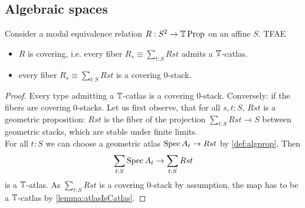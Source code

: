 \subsection{Algebraic spaces}
\begin{lemma}{\label{def:coveringEqRel}}
		Consider a modal equivalence relation $R : S^2 \to \mathbb{T} \operatorname{Prop}$ on an affine $S$. TFAE
		\begin{itemize}
			\item $R$ is covering, i.e. every fiber $R_s \equiv \sum_{t: S} R s t$ admits a $\mathbb{T}$-catlas.
			\item  every fiber $R_s \equiv \sum_{t: S} R s t$ is a covering 0-stack.
\end{itemize}
\end{lemma}
\begin{proof}
Every type admitting a $\mathbb{T}$-catlas is a covering 0-stack. 
Conversely: if the fibers are covering 0-stacks. Let us first observe, that for all $s , t : S$, $R s t$ is a geometric proposition: $R s t$ is the fiber of the projection $\sum_{t : S} R s t \to S$ between geometric stacks, which are stable under finite limits. \\

For all $t : S$ we can choose a geometric atlas $\operatorname{Spec} A_t \to R s t$ by \ref{def:algprop}. Then 
\[
\sum_{t:S} \operatorname{Spec} A_t \to \sum_{t : S} R s t
\]
is a $\mathbb{T}$-atlas. As $\sum_{t : S} R s t$ is a covering 0-stack by assumption, the map has to be a $\mathbb{T}$-catlas by \ref{lemma:atlasIsCatlas}. 
\end{proof}

